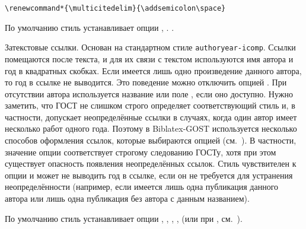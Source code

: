 \documentclass[10pt,a4paper,headings=small,numbers=enddot,english,russian]{ltxdockit}[2011/03/25]
\newcommand*{\biblatex}{Biblatex\xspace}
\newcommand*{\biblatexgost}{\biblatex-GOST\xspace}
\newcommand*{\bibsty}{\texttt}
\begin{document}
\begin{marglist}
\begin{lstlisting}[style=latex]
\renewcommand*{\multicitedelim}{\addsemicolon\space}
\end{lstlisting}

По умолчанию стиль устанавливает опции , .
.

\item[gost-authoryear]
Затекстовые ссылки. Основан на стандартном 
стиле \bibsty{authoryear-icomp}. Ссылки помещаются после текста, и для их связи 
с текстом используются имя автора и год в квадратных скобках. Если имеется лишь одно
произведение данного автора, то год в ссылке не выводится. Это поведение можно 
отключить опцией . При отсутствии автора
используется название или поле , если оно доступно. Нужно заметить, что ГОСТ 
не слишком строго определяет соответствующий стиль и, в частности, допускает неопределённые 
ссылки в случаях, когда один автор имеет несколько 
работ одного года. Поэтому в \biblatexgost используется несколько способов оформления
ссылок, которые выбираются опцией  (см.~).
В частности, значение опции  соответствует строгому 
следованию ГОСТу, хотя при этом существует опасность появления неопределённых ссылок.
Стиль чувствителен к опции  и может не выводить год в ссылке, если он 
не требуется для устранения неопределённости (например, если имеется лишь одна публикация 
данного автора или лишь одна публикация без автора с данным названием).

По умолчанию стиль устанавливает опции 
, 
,
,
,
 (или  при , 
см.~). 

\item[gost-inline-min]\vspace{-\itemsep}\vspace{-\parsep}
\item[gost-footnote-min]\vspace{-\itemsep}\vspace{-\parsep}
\item[gost-numeric-min]\vspace{-\itemsep}\vspace{-\parsep}
\item[gost-authoryear-min]\vspace{-\itemsep}\vspace{-\parsep}


\end{marglist}
\end{document}
